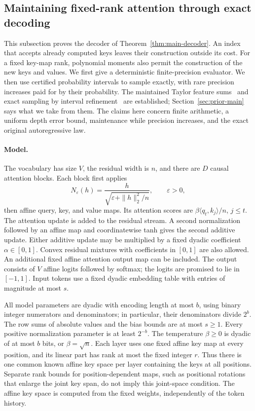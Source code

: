 \subsection{Maintaining fixed-rank attention through exact decoding}
\label{sec:momentdecoder}

This subsection proves the decoder of Theorem~\ref{thm:main-decoder}.
An index that accepts already computed keys leaves their construction
outside its cost.  For a fixed key-map rank, polynomial moments also
permit the construction of the new keys and values.  We first give a
deterministic finite-precision evaluator.  We then use certified
probability intervals to sample exactly, with rare precision increases
paid for by their probability.  The maintained Taylor feature
sums~\cite{katharopoulos2020linear,heinsen2026taylor} and exact
sampling by interval refinement~\cite{han1997interval,brassard2019remote}
are established; Section~\ref{sec:prior-main} says what we take from
them.  The claims here concern finite arithmetic, a uniform depth error
bound, maintenance while precision increases, and the exact original
autoregressive law.

\paragraph{Model.}
The vocabulary has size $V$, the residual width is $n$, and there are
$D$ causal attention blocks.  Each block first applies
\[
 N_\varepsilon(h)=
 \frac{h}{\sqrt{\varepsilon+\|h\|_2^2/n}},\qquad \varepsilon>0,
\]
then affine query, key, and value maps.  Its attention scores are
$\beta\langle q_t,k_j\rangle/n$, $j\le t$.  The attention update
is added to the residual stream.  A second normalization followed by
an affine map and coordinatewise tanh gives the second additive
update.  Either additive update may be multiplied by a fixed dyadic
coefficient $\alpha\in[0,1]$.  Convex residual mixtures with
coefficients in $[0,1]$ are also allowed.
An additional fixed affine attention output map can be included.
The output consists of $V$ affine logits followed by softmax; the
logits are promised to lie in $[-1,1]$.  Input tokens use a fixed
dyadic embedding table with entries of magnitude at most $s$.

All model parameters are dyadic with encoding length at most $b$,
using binary integer numerators and denominators; in particular,
their denominators divide $2^b$.
The row sums of absolute values and the bias bounds are at most
$s\ge1$.  Every positive normalization parameter is at least
$2^{-b}$.  The temperature $\beta\ge0$ is dyadic of at most $b$
bits, or $\beta=\sqrt n$.  Each layer uses one fixed affine key
map at every position, and its linear part has rank at most the
fixed integer $r$.  Thus there is one common known affine key
space per layer containing the keys at all positions.  Separate
rank bounds for position-dependent maps, such as positional
rotations that enlarge the joint key span, do not imply this
joint-space condition.  The affine key space is computed from the
fixed weights, independently of the token history.

